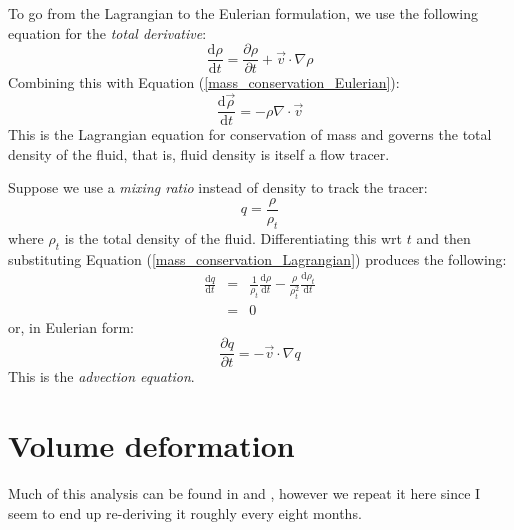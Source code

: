 \documentclass[12pt]{article}
\begin{document}
To go from the Lagrangian to the Eulerian formulation, 
we use the following equation for the {\it total derivative}:
\begin{equation}
\frac{\mathrm d \rho}{\mathrm d t}
 = \frac{\partial \rho}{\partial t} + \vec v \cdot \nabla \rho
\end{equation}
Combining this with Equation (\ref{mass_conservation_Eulerian}):
\begin{equation}
\frac{\mathrm d \vec \rho}{\mathrm d t} =  - \rho \nabla \cdot \vec v
\label{mass_conservation_Lagrangian}
\end{equation}
This is the Lagrangian equation for conservation of mass and governs the total density
of the fluid, that is, fluid density is itself a flow tracer.

Suppose we use a {\it mixing ratio} instead of density to track the
tracer:
\begin{equation}
q = \frac {\rho}{\rho_t}
\end{equation}
where $\rho_t$ is the total density of the fluid.  Differentiating this wrt
$t$ and then substituting Equation (\ref{mass_conservation_Lagrangian})
produces the following:
\begin{eqnarray}
\frac{\mathrm d q}{\mathrm d t} & = & \frac{1}{\rho_t} \frac{\mathrm d \rho}{\mathrm d t}
	- \frac{\rho}{\rho_t^2}\frac{\mathrm d \rho_t}{\mathrm d t}\\
& = & 0
\end{eqnarray}
or, in Eulerian form:
\begin{equation}
\frac{\partial q}{\partial t} = - \vec v \cdot \nabla q
\end{equation}
This is the {\it advection equation}.

\section{Volume deformation}

\label{deformation_section}

Much of this analysis can be found in \citet{Pattanayak2001} and 
\citet{Mills2004}, however we repeat it here since I seem to end up re-deriving
it roughly every eight months.
\end{document}
